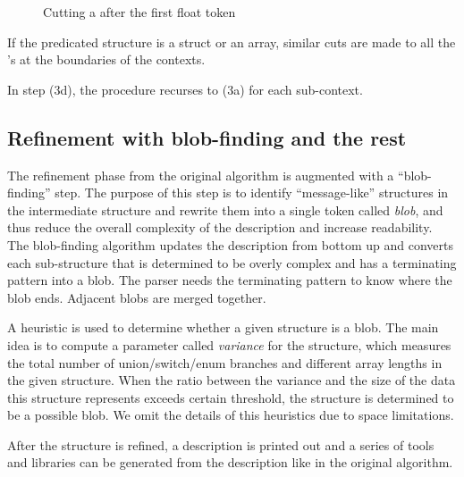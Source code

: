 \begin{figure}[th]
\begin{center}
\end{center}
\caption{Cutting a \seqset{} after the first float token} \label{fig:cut}
\end{figure}

If the predicated structure is a struct or an array, similar cuts are
made to all the \seqset's at the boundaries of the contexts.

In step (3d), the procedure recurses to (3a) for each sub-context.

\subsection{Refinement with blob-finding and the rest}
The refinement phase from the original algorithm is augmented with
a ``blob-finding'' step. The purpose of this step is to identify
``message-like'' structures in the intermediate structure and rewrite them into
a single token called {\em blob}, and thus reduce the overall complexity
of the description and increase readability. The blob-finding algorithm
updates the description from bottom up and converts each sub-structure that is
determined to be overly complex and has a terminating pattern into a
blob. The \pads{} parser needs the terminating pattern to
know where the blob ends. Adjacent blobs are merged together. 

A heuristic is used to determine whether a given structure is
a blob. The main idea is to compute a parameter called {\em variance}
for the structure, which measures the total number of union/switch/enum
branches and different array lengths in the given 
structure. When the ratio between the variance and the size of the data
this structure represents exceeds certain threshold, the structure is
determined to be a possible blob. We omit the details of this
heuristics due to space limitations.

After the structure is refined, a \pads{} description is printed out
and a series of tools and libraries can be generated from the description
like in the original algorithm.
